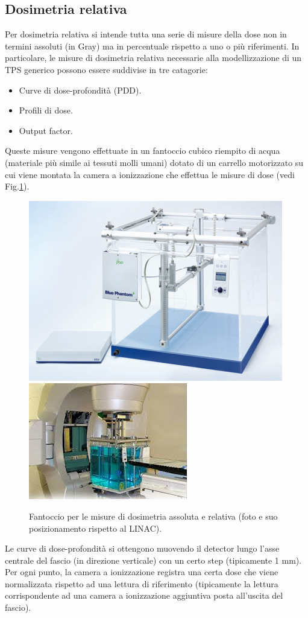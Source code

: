 \subsection{Dosimetria relativa}
\label{sec:dos_rel}
Per dosimetria relativa si intende tutta una serie di misure della dose non in termini assoluti (in Gray) ma in percentuale rispetto a uno o più riferimenti. In particolare, le misure di dosimetria relativa necessarie alla modellizzazione di un TPS generico possono essere suddivise in tre catagorie:
\begin{itemize}
\item Curve di dose-profondità (PDD).
\item Profili di dose.
\item Output factor.
\end{itemize}
Queste misure vengono effettuate in un fantoccio cubico riempito di acqua (materiale più simile ai tessuti molli umani) dotato di un carrello motorizzato su cui viene montata la camera a ionizzazione che effettua le misure di dose (vedi Fig.\ref{fig:wphant}).
\begin{figure}[!t]
\centering
\includegraphics[width=.45\textwidth]{./cap2/wphant.jpg}
\includegraphics[width=.45\textwidth]{./cap2/wphant_pos.jpg}
\caption{Fantoccio per le misure di dosimetria assoluta e relativa (foto e suo posizionamento rispetto al LINAC).}
\label{fig:wphant}
\end{figure}

Le curve di dose-profondità si ottengono muovendo il detector lungo l'asse centrale del fascio (in direzione verticale) con un certo step (tipicamente 1 mm).\\
Per ogni punto, la camera a ionizzazione registra una certa dose che viene normalizzata rispetto ad una lettura di riferimento (tipicamente la lettura corrispondente ad una camera a ionizzazione aggiuntiva posta all'uscita del fascio).


